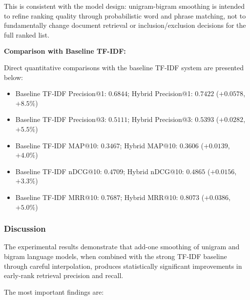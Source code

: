 This is consistent with the model design: unigram-bigram smoothing is intended to refine ranking quality through probabilistic word and phrase matching, not to fundamentally change document retrieval or inclusion/exclusion decisions for the full ranked list.

\vspace{0.2cm}

\textbf{Comparison with Baseline TF-IDF:}

Direct quantitative comparisons with the baseline TF-IDF system are presented below:

\begin{itemize}
    \item Baseline TF-IDF Precision@1: $0.6844$; Hybrid Precision@1: $0.7422$ ($+0.0578$, $+8.5\%$)
    \item Baseline TF-IDF Precision@3: $0.5111$; Hybrid Precision@3: $0.5393$ ($+0.0282$, $+5.5\%$)
    \item Baseline TF-IDF MAP@10: $0.3467$; Hybrid MAP@10: $0.3606$ ($+0.0139$, $+4.0\%$)
    \item Baseline TF-IDF nDCG@10: $0.4709$; Hybrid nDCG@10: $0.4865$ ($+0.0156$, $+3.3\%$)
    \item Baseline TF-IDF MRR@10: $0.7687$; Hybrid MRR@10: $0.8073$ ($+0.0386$, $+5.0\%$)
\end{itemize}

\vspace{0.2cm}

\subsubsection{Discussion}

The experimental results demonstrate that add-one smoothing of unigram and bigram language models, when combined with the strong TF-IDF baseline through careful interpolation, produces statistically significant improvements in early-rank retrieval precision and recall.

The most important findings are:

